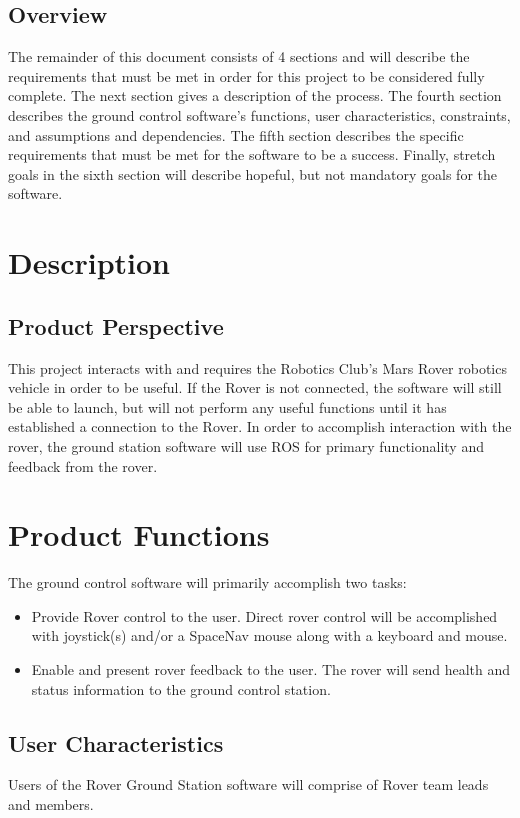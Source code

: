 \documentclass[onecolumn, draftclsnofoot, 10pt, compsoc]{IEEEtran}
\begin{document}
\subsection{Overview}
The remainder of this document consists of 4 sections and will describe the requirements that must be met in order for this project to be considered fully complete. The next section gives a description of the process. 
The fourth section describes the ground control software's functions, user characteristics, constraints, and assumptions and dependencies. 
The fifth section describes the specific requirements that must be met for the software to be a success.
Finally, stretch goals in the sixth section will describe hopeful, but not mandatory goals for the software.

\section{Description}
\subsection{Product Perspective}
This project interacts with and requires the Robotics Club's Mars Rover robotics vehicle in order to be useful.
If the Rover is not connected, the software will still be able to launch, but will not perform any useful functions until it has established a connection to the Rover.
In order to accomplish interaction with the rover, the ground station software will use ROS for primary functionality and feedback from the rover.


\section{Product Functions}
The ground control software will primarily accomplish two tasks:
\begin{itemize}
\item Provide Rover control to the user.
Direct rover control will be accomplished with joystick(s) and/or a SpaceNav mouse along with a keyboard and mouse.
\item Enable and present rover feedback to the user.
The rover will send health and status information to the ground control station.
\end{itemize}


\subsection{User Characteristics}
Users of the Rover Ground Station software will comprise of Rover team leads and members.
\end{document}
